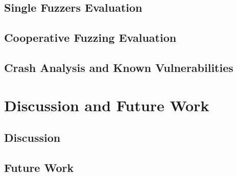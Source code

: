 \documentclass[handout]{beamer}
\begin{document}
\subsection{Single Fuzzers Evaluation}

\subsection{Cooperative Fuzzing Evaluation}

\subsection{Crash Analysis and Known Vulnerabilities}

\section{Discussion and Future Work}

\subsection*{Discussion}

\subsection*{Future Work}
\end{document}
